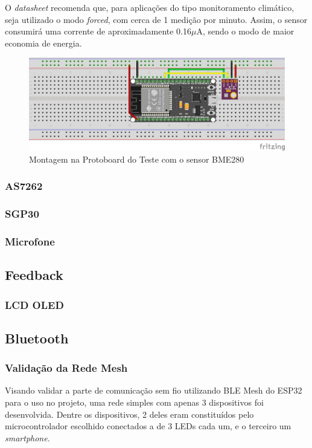 \documentclass[../monografia.tex]{subfiles}
\begin{document}
O \textit{datasheet} recomenda que, para aplicações do tipo monitoramento climático, seja utilizado o modo \textit{forced}, com cerca de 1 medição por minuto. Assim, o sensor consumirá uma corrente de aproximadamente 0.16$\mu$A, sendo o modo de maior economia de energia. 

\begin{figure}[h]
	\centering
	\includegraphics[width=12cm]{teste_bme280}
	\caption{Montagem na Protoboard do Teste com o sensor BME280}
	\label{fig:time_bme280}
\end{figure}

\subsubsection{AS7262}
\subsubsection{SGP30}
\subsubsection{Microfone}
\subsection{Feedback}
\subsubsection{LCD OLED}
\subsection{Bluetooth}
\subsubsection{Validação da Rede Mesh}

Visando validar a parte de comunicação sem fio utilizando BLE Mesh do ESP32 para o uso no projeto, uma rede simples com apenas 3 dispositivos foi desenvolvida. Dentre os dispositivos, 2 deles eram constituídos pelo microcontrolador escolhido conectados a de 3 LEDs cada um, e o terceiro um \textit{smartphone}. 
\end{document}
